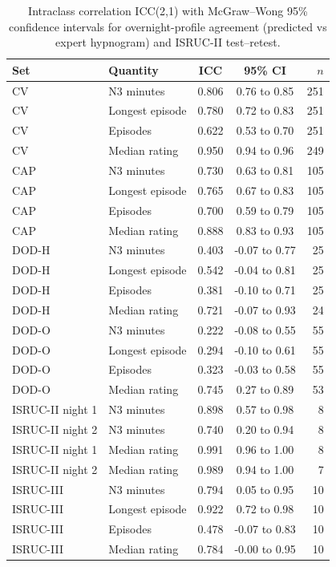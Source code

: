 \documentclass[journal]{IEEEtran}
\begin{document}
\begin{table}[!t]
\caption{Intraclass correlation ICC(2,1) with McGraw--Wong 95\% confidence intervals for overnight-profile agreement (predicted vs expert hypnogram) and ISRUC-II test--retest.}
\centering\scriptsize
\begin{tabular}{@{}llccr@{}}
\toprule
Set & Quantity & ICC & 95\% CI & $n$ \\
\midrule
CV & N3 minutes & 0.806 & 0.76 to 0.85 & 251 \\
CV & Longest episode & 0.780 & 0.72 to 0.83 & 251 \\
CV & Episodes & 0.622 & 0.53 to 0.70 & 251 \\
CV & Median rating & 0.950 & 0.94 to 0.96 & 249 \\
CAP & N3 minutes & 0.730 & 0.63 to 0.81 & 105 \\
CAP & Longest episode & 0.765 & 0.67 to 0.83 & 105 \\
CAP & Episodes & 0.700 & 0.59 to 0.79 & 105 \\
CAP & Median rating & 0.888 & 0.83 to 0.93 & 105 \\
DOD-H & N3 minutes & 0.403 & -0.07 to 0.77 & 25 \\
DOD-H & Longest episode & 0.542 & -0.04 to 0.81 & 25 \\
DOD-H & Episodes & 0.381 & -0.10 to 0.71 & 25 \\
DOD-H & Median rating & 0.721 & -0.07 to 0.93 & 24 \\
DOD-O & N3 minutes & 0.222 & -0.08 to 0.55 & 55 \\
DOD-O & Longest episode & 0.294 & -0.10 to 0.61 & 55 \\
DOD-O & Episodes & 0.323 & -0.03 to 0.58 & 55 \\
DOD-O & Median rating & 0.745 & 0.27 to 0.89 & 53 \\
ISRUC-II night 1 & N3 minutes & 0.898 & 0.57 to 0.98 & 8 \\
ISRUC-II night 2 & N3 minutes & 0.740 & 0.20 to 0.94 & 8 \\
ISRUC-II night 1 & Median rating & 0.991 & 0.96 to 1.00 & 8 \\
ISRUC-II night 2 & Median rating & 0.989 & 0.94 to 1.00 & 7 \\
ISRUC-III & N3 minutes & 0.794 & 0.05 to 0.95 & 10 \\
ISRUC-III & Longest episode & 0.922 & 0.72 to 0.98 & 10 \\
ISRUC-III & Episodes & 0.478 & -0.07 to 0.83 & 10 \\
ISRUC-III & Median rating & 0.784 & -0.00 to 0.95 & 10 \\

\end{tabular}
\end{table}
\end{document}
